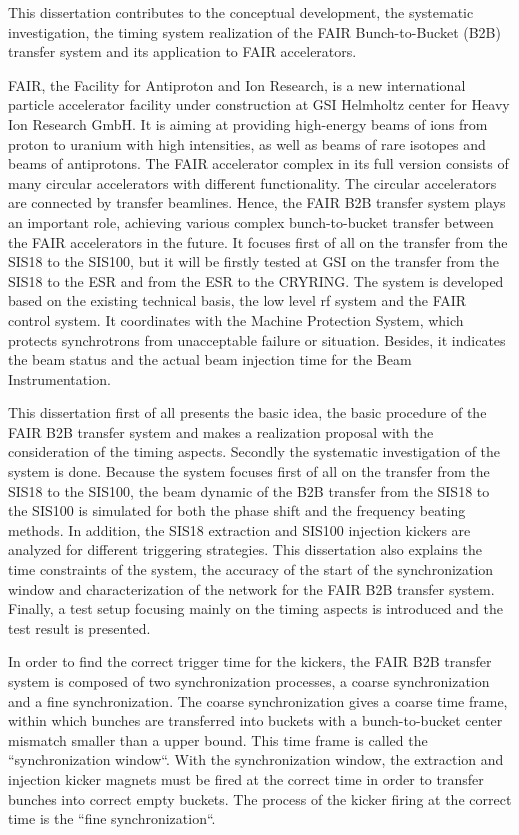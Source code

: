 This dissertation contributes to the conceptual development, the systematic investigation, the timing system realization of the FAIR Bunch-to-Bucket (B2B) transfer system and its application to FAIR accelerators. 

FAIR, the Facility for Antiproton and Ion Research, is a new international particle accelerator facility under construction at GSI Helmholtz center for Heavy Ion Research GmbH. It is aiming at providing high-energy beams of ions from proton to uranium with high intensities, as well as beams of rare isotopes and beams of antiprotons. The FAIR accelerator complex in its full version consists of many circular accelerators with different functionality. The circular accelerators are connected by transfer beamlines. Hence, the FAIR B2B transfer system plays an important role, achieving various complex bunch-to-bucket transfer between the FAIR accelerators in the future. It focuses first of all on the transfer from the SIS18 to the SIS100, but it will be firstly tested at GSI on the transfer from the SIS18 to the ESR and from the ESR to the CRYRING. The system is developed based on the existing technical basis, the low level rf system and the FAIR control system. It coordinates with the Machine Protection System, which protects synchrotrons from unacceptable failure or situation. Besides, it indicates the beam status and the actual beam injection time for the Beam Instrumentation. 
 
This dissertation first of all presents the basic idea, the basic procedure of the FAIR B2B transfer system and makes a realization proposal with the consideration of the timing aspects. Secondly the systematic investigation of the system is done. Because the system focuses first of all on the transfer from the SIS18 to the SIS100, the beam dynamic of the B2B transfer from the SIS18 to the SIS100 is simulated for both the phase shift and the frequency beating methods. In addition, the SIS18 extraction and SIS100 injection kickers are analyzed for different triggering strategies. This dissertation also explains the time constraints of the system, the accuracy of the start of the synchronization window and characterization of the network for the FAIR B2B transfer system. Finally, a test setup focusing mainly on the timing aspects is introduced and the test result is presented. 

In order to find the correct trigger time for the kickers, the FAIR B2B transfer system is composed of two synchronization processes, a coarse synchronization and a fine synchronization. The coarse synchronization gives a coarse time frame, within which bunches are transferred into buckets with a bunch-to-bucket center mismatch smaller than a upper bound. This time frame is called the ``synchronization window``. With the synchronization window, the extraction and injection kicker magnets must be fired at the correct time in order to transfer bunches into correct empty buckets. The process of the kicker firing at the correct time is the ``fine synchronization``. 

